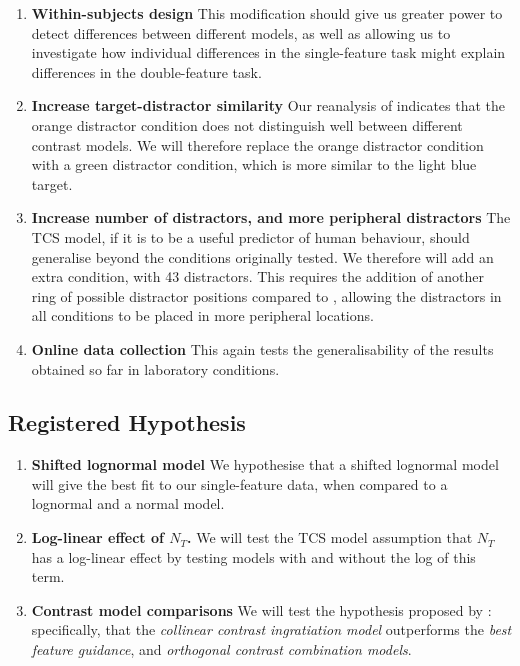 \documentclass[smallextended, natbib]{svjour3}       %
\begin{document}
\begin{enumerate}
\item \textbf{Within-subjects design} This modification should give us greater power to detect differences between different models, as well as allowing us to investigate how individual differences in the single-feature task might explain differences in the double-feature task.
\\
\item \textbf{Increase target-distractor similarity} Our reanalysis of \cite{buetti2019predicting} indicates that the orange distractor condition does not distinguish well between different contrast models. We will therefore replace the orange distractor condition with a green distractor condition, which is more similar to the light blue target.
\\
\item \textbf{Increase number of distractors, and more peripheral distractors} The TCS model, if it is to be a useful predictor of human behaviour, should generalise beyond the conditions originally tested. We therefore will add an extra condition, with 43 distractors. This requires the addition of another ring of possible distractor positions compared to \cite{buetti2019predicting}, allowing the distractors in all conditions to be placed in more peripheral locations. 
\\
\item \textbf{Online data collection} This again tests the generalisability of the results obtained so far in laboratory conditions.
\end{enumerate}

\subsection{Registered Hypothesis}

\begin{enumerate}
\item \textbf{Shifted lognormal model} We hypothesise that a shifted lognormal model will give the best fit to our single-feature data, when compared to a lognormal and a normal model. \\
\item \textbf{Log-linear effect of $N_T$.} We will test the TCS model assumption that $N_T$ has a log-linear effect by testing models with and without the log of this term.\\ 
\item \textbf{Contrast model comparisons} We will test the hypothesis proposed by \citep{buetti2019predicting}: specifically, that the \textit{collinear contrast ingratiation model} outperforms the \textit{best feature guidance}, and \textit{orthogonal contrast combination models}.\\
\end{enumerate}
\end{document}
